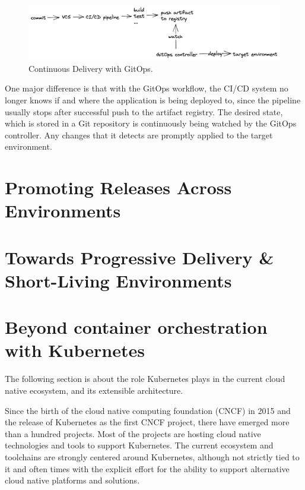 \begin{figure}[h]
	\centering
	\includegraphics[width=1.00\linewidth]{assets/cd-gitops.png}
	\caption{Continuous Delivery with GitOps.
	}
	\label{fig:cd-gitops}	
\end{figure}

One major difference is that with the GitOps workflow,
the CI/CD system no longer knows if and where the application is being
deployed to, since the pipeline usually stops after successful push to the artifact registry.
The desired state, which is stored in a Git repository is continuously being watched
by the GitOps controller. Any changes that it detects are promptly applied to the
target environment.











\section{Promoting Releases Across Environments}

\section{Towards Progressive Delivery \& Short-Living Environments}

\section{Beyond container orchestration with Kubernetes}

The following section is about
the role Kubernetes plays in the current cloud native ecosystem,
and its extensible architecture.

Since the birth of the cloud native computing foundation (CNCF) in 2015 and the release of Kubernetes as the first CNCF project,
there have emerged more than a hundred projects.
Most of the projects are hosting cloud native technologies and tools to support Kubernetes.
The current ecosystem and toolchains are strongly centered around Kubernetes,
although not strictly tied to it and often times with the explicit effort
for the ability to support alternative cloud native platforms and solutions.

